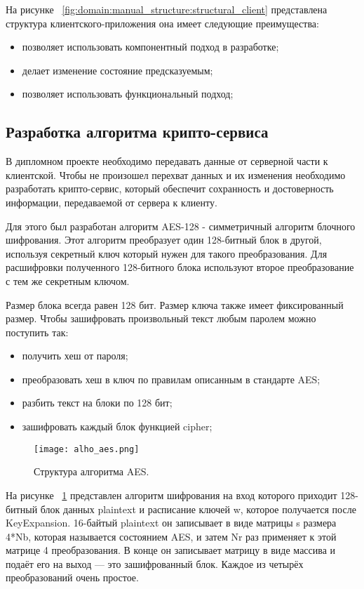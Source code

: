 На рисунке ~\ref{fig:domain:manual_structure:structural_client} представлена структура клиентского-приложения она имеет следующие преимущества:
\begin{itemize}
  \item позволяет использовать компонентный подход в разработке;
  \item делает изменение состояние предсказуемым;
  \item позволяет использовать функциональный подход;
\end{itemize}

\subsection{Разработка алгоритма крипто-сервиса }
\label{sub:arch_and_mod:alholib-crypto}

В дипломном проекте необходимо передавать данные от серверной части к клиентской. Чтобы не произошел перехват данных и их изменения необходимо разработать крипто-сервис, который обеспечит сохранность и достоверность информации, передаваемой от сервера к клиенту.

Для этого был разработан алгоритм AES-128 - симметричный алгоритм блочного шифрования. Этот алгоритм преобразует один 128-битный блок в другой, используя секретный ключ который нужен для такого преобразования. Для расшифровки полученного 128-битного блока используют второе преобразование с тем же секретным ключом.

Размер блока всегда равен 128 бит. Размер ключа также имеет фиксированный размер. Чтобы зашифровать произвольный текст любым паролем можно поступить так: 

\begin{itemize}
  \item получить хеш от пароля;
  \item преобразовать хеш в ключ по правилам описанным в стандарте AES;
  \item разбить текст на блоки по 128 бит;
  \item зашифровать каждый блок функцией cipher;
\end{itemize}
\begin{figure}[ht]
\centering
  \texttt{[image: alho\_aes.png]}  
  \caption{ Структура алгоритма AES. }
  \label{fig:domain:manual_structure:structural_aes}
\end{figure}
На рисунке ~\ref{fig:domain:manual_structure:structural_aes} представлен алгоритм шифрования на вход которого приходит 128-битный блок данных plaintext и расписание ключей w, которое получается после KeyExpansion. 16-байтый plaintext он записывает в виде матрицы s размера 4*Nb, которая называется состоянием AES, и затем Nr раз применяет к этой матрице 4 преобразования. В конце он записывает матрицу в виде массива и подаёт его на выход — это зашифрованный блок. Каждое из четырёх преобразований очень простое.

